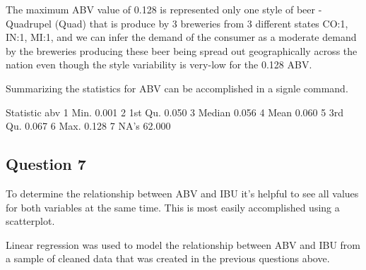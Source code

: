 \documentclass[]{article}
\newenvironment{Shaded}{\begin{snugshade}}{\end{snugshade}}
\newcommand{\KeywordTok}[1]{\textcolor[rgb]{0.13,0.29,0.53}{\textbf{#1}}}
\newcommand{\DataTypeTok}[1]{\textcolor[rgb]{0.13,0.29,0.53}{#1}}
\newcommand{\DecValTok}[1]{\textcolor[rgb]{0.00,0.00,0.81}{#1}}
\newcommand{\StringTok}[1]{\textcolor[rgb]{0.31,0.60,0.02}{#1}}
\newcommand{\CommentTok}[1]{\textcolor[rgb]{0.56,0.35,0.01}{\textit{#1}}}
\newcommand{\OperatorTok}[1]{\textcolor[rgb]{0.81,0.36,0.00}{\textbf{#1}}}
\newcommand{\NormalTok}[1]{#1}
\begin{document}
The maximum ABV value of 0.128 is represented only one style of beer
-Quadrupel (Quad) that is produce by 3 breweries from 3 different states
CO:1, IN:1, MI:1, and we can infer the demand of the consumer as a
moderate demand by the breweries producing these beer being spread out
geographically across the nation even though the style variability is
very-low for the 0.128 ABV.

Summarizing the statistics for ABV can be accomplished in a signle
command.

\begin{Shaded}
\end{Shaded}

Statistic abv 1 Min. 0.001 2 1st Qu. 0.050 3 Median 0.056 4 Mean 0.060 5
3rd Qu. 0.067 6 Max. 0.128 7 NA's 62.000

\subsection{Question 7}\label{question-7}

To determine the relationship between ABV and IBU it's helpful to see
all values for both variables at the same time. This is most easily
accomplished using a scatterplot.

Linear regression was used to model the relationship between ABV and IBU
from a sample of cleaned data that was created in the previous questions
above.
\end{document}
